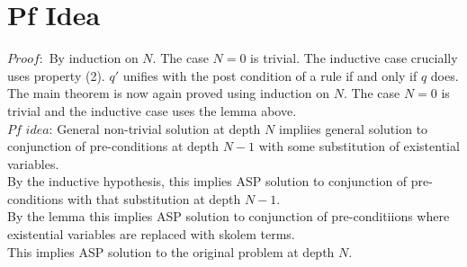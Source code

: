 \documentclass{article}
\begin{document}
\section{Pf Idea}
$Proof:$ By induction on $N$. The case $N=0$ is trivial. The inductive case crucially uses property (2). $q'$ unifies with the post condition of a rule if and only if $q$ does.
The main theorem is now again proved using induction on $N$. The case $N=0$ is trivial and the inductive case uses the lemma above.\\
\newline
$Pf$ $idea$: General non-trivial solution at depth $N$ impliies general solution to conjunction of pre-conditions at depth $N-1$ with some substitution of existential variables.\\
\newline
By the inductive hypothesis, this implies ASP solution to conjunction of pre-conditions with that substitution at depth $N-1$.\\
\newline
By the lemma this implies ASP solution to conjunction of pre-conditiions where existential variables are replaced with skolem terms. \\
\newline
This implies ASP solution to the original problem at depth $N$.\\
\end{document}
